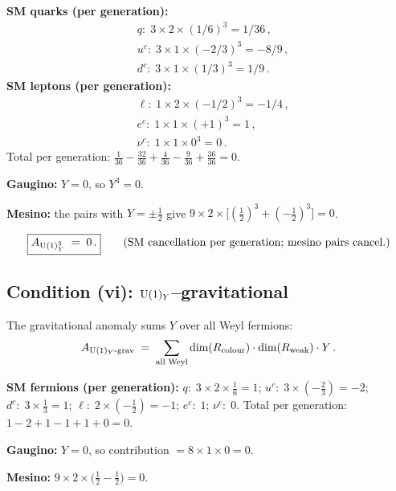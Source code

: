 \documentclass[11pt,a4paper]{article}
\begin{document}
\textbf{SM quarks (per generation):}
\begin{align}
  &q:\; 3 \times 2 \times (1/6)^3 = 1/36\,,
  \nonumber\\
  &u^c:\; 3 \times 1 \times (-2/3)^3 = -8/9\,,
  \nonumber\\
  &d^c:\; 3 \times 1 \times (1/3)^3 = 1/9\,.
  \label{eq:u1-quarks}
\end{align}
\textbf{SM leptons (per generation):}
\begin{align}
  &\ell:\; 1 \times 2 \times (-1/2)^3 = -1/4\,,
  \nonumber\\
  &e^c:\; 1 \times 1 \times (+1)^3 = 1\,,
  \nonumber\\
  &\nu^c:\; 1 \times 1 \times 0^3 = 0\,.
  \label{eq:u1-leptons}
\end{align}
Total per generation:
$\tfrac{1}{36} - \tfrac{32}{36} + \tfrac{4}{36} - \tfrac{9}{36}
+ \tfrac{36}{36} = 0$.

\textbf{Gaugino:} $Y = 0$, so $Y^3 = 0$.

\textbf{Mesino:} the pairs with $Y = \pm\tfrac{1}{2}$ give
$9 \times 2 \times \bigl[(\tfrac{1}{2})^3 + (-\tfrac{1}{2})^3\bigr] = 0$.

\begin{equation}\label{eq:u1-cubed-result}
  \boxed{A_{\mathrm{U}(1)_Y^3} \;=\; 0\,.}
  \qquad\text{(SM cancellation per generation; mesino pairs cancel.)}
\end{equation}

\subsection{Condition (vi): $\mathrm{U}(1)_Y$--gravitational}

The gravitational anomaly sums $Y$ over all Weyl fermions:
\begin{equation}\label{eq:u1-grav}
  A_{\mathrm{U}(1)_Y\text{-grav}}
  \;=\; \sum_{\text{all Weyl}} \dim(R_{\text{colour}}) \cdot \dim(R_{\text{weak}}) \cdot Y\,.
\end{equation}

\textbf{SM fermions (per generation):}
$q:\; 3 \times 2 \times \tfrac{1}{6} = 1$;
$u^c:\; 3 \times (-\tfrac{2}{3}) = -2$;
$d^c:\; 3 \times \tfrac{1}{3} = 1$;
$\ell:\; 2 \times (-\tfrac{1}{2}) = -1$;
$e^c:\; 1$;
$\nu^c:\; 0$.
Total per generation: $1 - 2 + 1 - 1 + 1 + 0 = 0$.

\textbf{Gaugino:} $Y = 0$, so contribution $= 8 \times 1 \times 0 = 0$.

\textbf{Mesino:} $9 \times 2 \times \bigl(\tfrac{1}{2} - \tfrac{1}{2}\bigr) = 0$.
\end{document}
